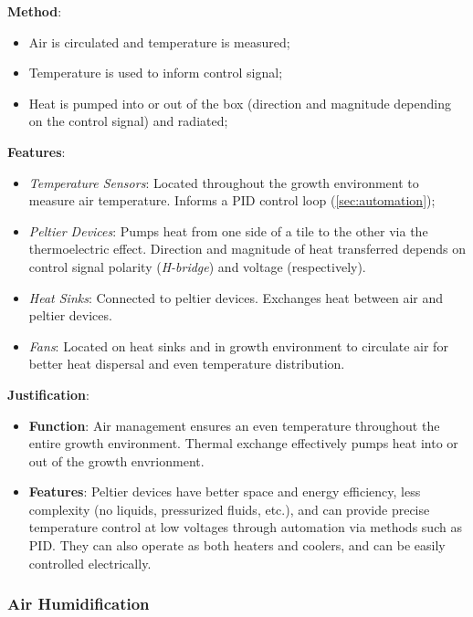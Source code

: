 \documentclass{report}
\begin{document}
\textbf{Method}:
\begin{itemize}
    \item Air is circulated and temperature is measured;
    \item Temperature is used to inform control signal;
    \item Heat is pumped into or out of the box (direction and magnitude depending on the control signal) and radiated;
\end{itemize}

\textbf{Features}:
\begin{itemize}
    \item \textit{Temperature Sensors}: Located throughout the growth environment to measure air temperature. Informs a PID control loop (\ref{sec:automation});
    \item \textit{Peltier Devices}: Pumps heat from one side of a tile to the other via the thermoelectric effect. Direction and magnitude of heat transferred depends on control signal polarity (\textit{H-bridge}) and voltage (respectively).
    \item \textit{Heat Sinks}: Connected to peltier devices. Exchanges heat between air and peltier devices.
    \item \textit{Fans}: Located on heat sinks and in growth environment to circulate air for better heat dispersal and even temperature distribution.
\end{itemize}

\textbf{Justification}: 
\begin{itemize}
    \item \textbf{Function}: Air management ensures an even temperature throughout the entire growth environment. Thermal exchange effectively pumps heat into or out of the growth envrionment.
    \item \textbf{Features}: Peltier devices have better space and energy efficiency, less complexity (no liquids, pressurized fluids, etc.), and can provide precise temperature control at low voltages through automation via methods such as PID. They can also operate as both heaters and coolers, and can be easily controlled electrically.
\end{itemize}

\newpage

\subsubsection{Air Humidification}
\label{sec:airhum}
\end{document}
